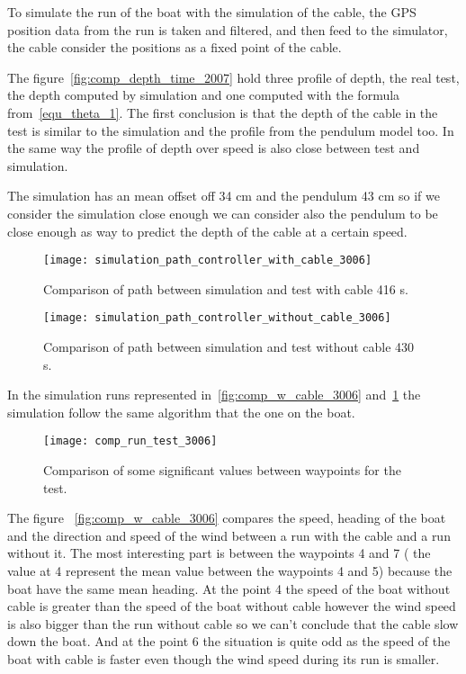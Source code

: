 To simulate the run of the boat with the simulation of the cable, the GPS position data from the run is taken and filtered, and then feed to the simulator, the cable consider the positions as a fixed point of the cable.

The figure~\ref{fig:comp_depth_time_2007} hold three profile of depth, the real test, the depth computed by simulation and one computed with the formula from~\ref{equ_theta_1}. The first conclusion is that the depth of the cable in the test is similar to the simulation and the profile from the pendulum model too.
 In the same way the profile of depth over speed is also close between test and simulation.
 
 The simulation has an mean offset off 34 cm and the pendulum 43 cm so if we consider the simulation close enough we can consider also the pendulum to be close enough as way to predict the depth of the cable at a certain speed.
 
 \begin{figure}[H]
\centering
    \begin{minipage}[b]{0.4\textwidth}
    \centering
    \texttt{[image: simulation\_path\_controller\_with\_cable\_3006]}
    \caption{Comparison of path between simulation and test with cable 416 s.}
    \label{fig:comp_w_cable_3006}
    \end{minipage}
    \hfill
    \begin{minipage}[b]{0.45\textwidth}
    \centering
    \texttt{[image: simulation\_path\_controller\_without\_cable\_3006]}
    \caption{Comparison of path between simulation and test without cable 430 s.}
    \label{fig:comp_wt_cable_3006}
    \end{minipage}
\end{figure}

In the simulation runs represented in~\ref{fig:comp_w_cable_3006} and~\ref{fig:comp_wt_cable_3006} the simulation follow the same algorithm that the one on the boat.

 \begin{figure}[H]
    \centering
    \texttt{[image: comp\_run\_test\_3006]}
    \caption{Comparison of some significant values between waypoints for the test.}
    \label{fig:comp_run_306}
\end{figure}

The figure ~\ref{fig:comp_w_cable_3006} compares the speed, heading of the boat and the direction and speed of the wind between a run with the cable and a run without it. The most interesting part is between the waypoints 4 and 7 ( the value at 4 represent the mean value between the waypoints 4 and 5)  because the boat have the same mean heading. At the point 4 the speed of the boat without cable is greater than the speed of the boat without cable however the wind speed is also bigger than the run without cable so we can't conclude that the cable slow down the boat. And at the point 6 the situation is quite odd as the speed of the boat with cable is faster 
even though the wind speed during its run is smaller.

